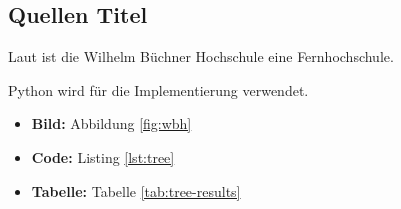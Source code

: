 \subsection{Quellen Titel}               %
Laut \cite{Willhelm} ist die Wilhelm Büchner Hochschule eine Fernhochschule. \par  %
Python \cite{PythonDoc} wird für die Implementierung verwendet. \par\vspace\baselineskip  %
\begin{itemize}                          %
    \item \textbf{Bild:} Abbildung \ref{fig:wbh}            %
    \item \textbf{Code:} Listing \ref{lst:tree}             %
    \item \textbf{Tabelle:} Tabelle \ref{tab:tree-results}  %
\end{itemize}




